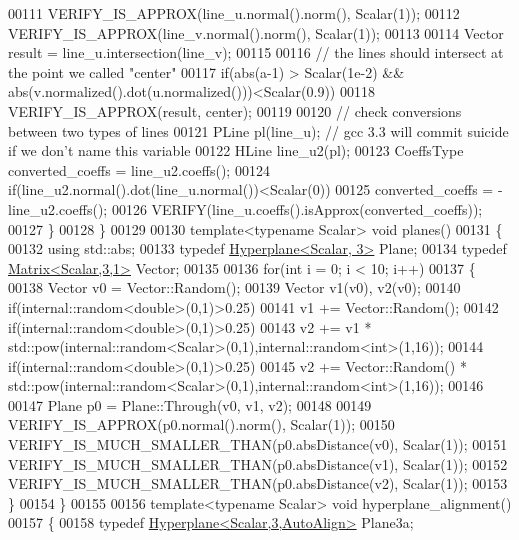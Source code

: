 \begin{DoxyCode}
00111     VERIFY\_IS\_APPROX(line\_u.normal().norm(), Scalar(1));
00112     VERIFY\_IS\_APPROX(line\_v.normal().norm(), Scalar(1));
00113 
00114     Vector result = line\_u.intersection(line\_v);
00115 
00116     \textcolor{comment}{// the lines should intersect at the point we called "center"}
00117     \textcolor{keywordflow}{if}(abs(a-1) > Scalar(1e-2) && abs(v.normalized().dot(u.normalized()))<Scalar(0.9))
00118       VERIFY\_IS\_APPROX(result, center);
00119 
00120     \textcolor{comment}{// check conversions between two types of lines}
00121     PLine pl(line\_u); \textcolor{comment}{// gcc 3.3 will commit suicide if we don't name this variable}
00122     HLine line\_u2(pl);
00123     CoeffsType converted\_coeffs = line\_u2.coeffs();
00124     \textcolor{keywordflow}{if}(line\_u2.normal().dot(line\_u.normal())<Scalar(0))
00125       converted\_coeffs = -line\_u2.coeffs();
00126     VERIFY(line\_u.coeffs().isApprox(converted\_coeffs));
00127   \}
00128 \}
00129 
00130 \textcolor{keyword}{template}<\textcolor{keyword}{typename} Scalar> \textcolor{keywordtype}{void} planes()
00131 \{
00132   \textcolor{keyword}{using} std::abs;
00133   \textcolor{keyword}{typedef} \hyperlink{group___geometry___module_class_eigen_1_1_hyperplane}{Hyperplane<Scalar, 3>} Plane;
00134   \textcolor{keyword}{typedef} \hyperlink{group___core___module}{Matrix<Scalar,3,1>} Vector;
00135 
00136   \textcolor{keywordflow}{for}(\textcolor{keywordtype}{int} i = 0; i < 10; i++)
00137   \{
00138     Vector v0 = Vector::Random();
00139     Vector v1(v0), v2(v0);
00140     \textcolor{keywordflow}{if}(internal::random<double>(0,1)>0.25)
00141       v1 += Vector::Random();
00142     \textcolor{keywordflow}{if}(internal::random<double>(0,1)>0.25)
00143       v2 += v1 * std::pow(internal::random<Scalar>(0,1),internal::random<int>(1,16));
00144     \textcolor{keywordflow}{if}(internal::random<double>(0,1)>0.25)
00145       v2 += Vector::Random() * std::pow(internal::random<Scalar>(0,1),internal::random<int>(1,16));
00146 
00147     Plane p0 = Plane::Through(v0, v1, v2);
00148 
00149     VERIFY\_IS\_APPROX(p0.normal().norm(), Scalar(1));
00150     VERIFY\_IS\_MUCH\_SMALLER\_THAN(p0.absDistance(v0), Scalar(1));
00151     VERIFY\_IS\_MUCH\_SMALLER\_THAN(p0.absDistance(v1), Scalar(1));
00152     VERIFY\_IS\_MUCH\_SMALLER\_THAN(p0.absDistance(v2), Scalar(1));
00153   \}
00154 \}
00155 
00156 \textcolor{keyword}{template}<\textcolor{keyword}{typename} Scalar> \textcolor{keywordtype}{void} hyperplane\_alignment()
00157 \{
00158   \textcolor{keyword}{typedef} \hyperlink{group___geometry___module_class_eigen_1_1_hyperplane}{Hyperplane<Scalar,3,AutoAlign>} Plane3a;

\end{DoxyCode}
